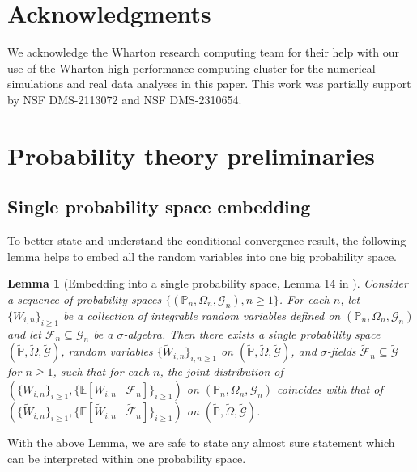 \documentclass[12pt]{article}
\newtheorem{lemma}{Lemma}
\theoremstyle{definition}
\def\P{\mathbb{P}}
\def\P{\mathbb{P}}
\newcommand{\E}{\mathbb E}								%
\renewcommand{\P}{\mathbb{P}}							%
\begin{document}
  \section{Acknowledgments}
  
  We acknowledge the Wharton research computing team for their help with our use of the Wharton high-performance computing cluster for the numerical simulations and real data analyses in this paper. This work was partially support by NSF DMS-2113072 and NSF DMS-2310654.



\printbibliography

\clearpage

\appendix


\section{Probability theory preliminaries}

\subsection{Single probability space embedding}
To better state and understand the conditional convergence result, the following lemma helps to embed all the random variables into one big probability space.

\begin{lemma}[Embedding into a single probability space, Lemma 14 in \cite{Niu2022a}]\label{lem:embedding}
	Consider a sequence of probability spaces $\{(\P_n,\Omega_n,\mathcal{G}_n),n \geq 1\}$. For each $n$, let $\{W_{i,n}\}_{i \geq 1}$ be a collection of integrable random variables defined on $(\P_n,\Omega_n,\mathcal{G}_n)$ and let $\mathcal F_n \subseteq \mathcal G_n$ be a $\sigma$-algebra. Then there exists a single probability space $(\widetilde{\P}, \widetilde{\Omega}, \widetilde{\mathcal G})$, random variables $\{\widetilde W_{i,n}\}_{i,n \geq 1}$ on $(\widetilde{\P}, \widetilde{\Omega}, \widetilde{\mathcal G})$, and $\sigma$-fields $\widetilde{\mathcal F}_n \subseteq \widetilde{\mathcal G}$ for $n \geq 1$, such that for each $n$, the joint distribution of $(\{W_{i,n}\}_{i \geq 1}, \{\E[W_{i,n}\mid\mathcal F_n]\}_{i \geq 1})$ on $(\P_n,\Omega_n,\mathcal{G}_n)$ coincides with that of $(\{\widetilde W_{i,n}\}_{i \geq 1}, \{\E[\widetilde W_{i,n}\mid \widetilde{\mathcal F}_n]\}_{i \geq 1})$ on $(\widetilde{\P}, \widetilde{\Omega}, \widetilde{\mathcal G})$.
\end{lemma}
\noindent With the above Lemma, we are safe to state any almost sure statement which can be interpreted within one probability space. 
\end{document}
